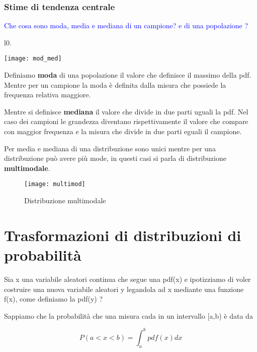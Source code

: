 \documentclass[11pt,a4paper]{book}
\begin{document}
\subsubsection{Stime di tendenza centrale}

\textcolor{blue}{Che cosa sono moda, media e mediana di un campione? e di una popolazione ?}


\begin{wrapfigure}[8]{l}{0.\textwidth}

\centering

\texttt{[image: mod\_med]}	

\end{wrapfigure}


\noindent Definiamo \textbf{moda} di una popolazione il valore che definisce il massimo della pdf. Mentre per un campione la moda \`{e} definita dalla misura che possiede la frequenza relativa maggiore.\newline

\noindent Mentre si definisce \textbf{mediana} il valore che  divide in due parti uguali la pdf. Nel caso dei campioni le grandezza diventano rispettivamente il valore che compare con maggior frequenza e la misura che divide in due parti eguali il campione.

Per media e mediana di una distribuzione sono unici mentre per una distribuzione pu\`{o} avere pi\`{u} mode, in questi casi si parla di distribuzione \textbf{multimodale}.

 
\begin{figure}[ht]
\vspace{0.3in}
\texttt{[image: multimod]}	
\centering
\vspace{0.3in}
\caption{Distribuzione multimodale}
\end{figure}

\section{Trasformazioni di distribuzioni di probabilit\`{a}}

Sia x una variabile aleatori continua  che segue una pdf(x) e ipotizziamo di voler costruire una nuova variabile aleatori y legandola ad x mediante una funzione f(x), come definiamo la pdf(y) ?

Sappiamo che la probabilit\`{a} che una misura cada in un intervallo [a,b) \`{e} data da 

\begin{equation*}
	P(a < x< b) = \int_{a}^{b}{pdf(x)dx}
\end{equation*}
\newline
\end{document}
